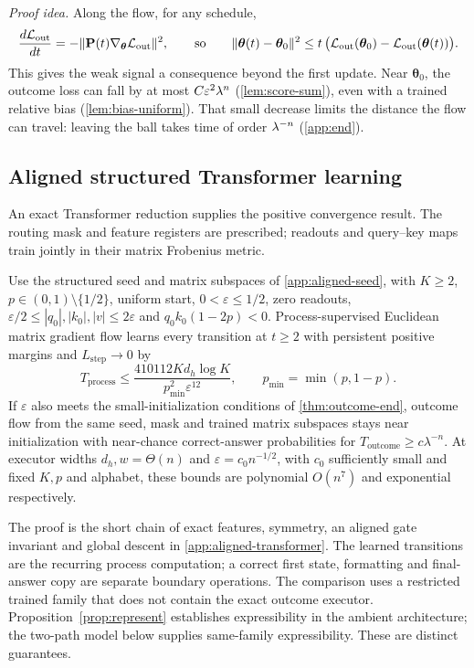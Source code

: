 \emph{Proof idea.} Along the flow, for any schedule,
\[
 \frac{d\mathcal L_{\mathrm{out}}}{dt}=-\|\mathbf P(t)\nabla_{\bm\theta}\mathcal L_{\mathrm{out}}\|^2,
 \qquad\text{so}\qquad
 \|\bm\theta(t)-\bm\theta_0\|^2\le t\,\bigl(\mathcal L_{\mathrm{out}}(\bm\theta_0)-\mathcal L_{\mathrm{out}}(\bm\theta(t))\bigr).
\]
This gives the weak signal a consequence beyond the first update. Near $\bm\theta_0$, the outcome loss can fall by at most
$C\varepsilon^2\lambda^n$ (\cref{lem:score-sum}), even with a trained relative bias (\cref{lem:bias-uniform}). That small decrease limits
the distance the flow can travel: leaving the ball takes time of order $\lambda^{-n}$ (\cref{app:end}).

\subsection{Aligned structured Transformer learning}
\label{sec:aligned-transformer}
An exact Transformer reduction supplies the positive convergence result.
The routing mask and feature registers are prescribed; readouts and query--key
maps train jointly in their matrix Frobenius metric.
\begin{theorem}
\label{thm:aligned-transformer}
Use the structured seed and matrix subspaces of \cref{app:aligned-seed}, with
$K\ge2$, $p\in(0,1)\setminus\{1/2\}$, uniform start, $0<\varepsilon\le1/2$,
zero readouts, $\varepsilon/2\le|q_0|,|k_0|,|v|\le2\varepsilon$ and
$q_0k_0(1-2p)<0$. Process-supervised Euclidean matrix gradient flow learns
every transition at $t\ge2$ with persistent positive margins and
$L_{\mathrm{step}}\to0$ by
\[
 T_{\mathrm{process}}\le
 \frac{410112K d_h\log K}{p_{\min}^2\varepsilon^{12}},
 \qquad p_{\min}=\min(p,1-p).
\]
If $\varepsilon$ also meets the small-initialization conditions of
\cref{thm:outcome-end}, outcome flow from the same seed, mask and trained
matrix subspaces stays near initialization with near-chance correct-answer
probabilities for $T_{\mathrm{outcome}}\ge c\lambda^{-n}$.
At executor widths $d_h,w=\Theta(n)$ and $\varepsilon=c_0n^{-1/2}$, with $c_0$
sufficiently small and fixed $K,p$ and alphabet, these bounds are polynomial $O(n^7)$
and exponential respectively.
\end{theorem}
The proof is the short chain of exact features, symmetry, an aligned gate
invariant and global descent in \cref{app:aligned-transformer}.
The learned transitions are the recurring process computation; a correct first
state, formatting and final-answer copy are separate boundary operations.
The comparison uses a restricted trained family that does not contain the
exact outcome executor. Proposition~\ref{prop:represent} establishes expressibility
in the ambient architecture; the two-path model below supplies same-family
expressibility. These are distinct guarantees.

